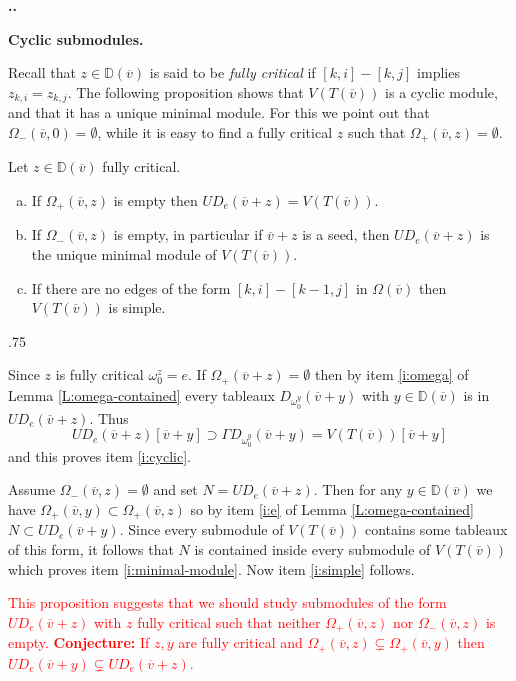 \documentclass[11pt,fleqn]{amsart}
\makeatletter
\renewcommand\thesection{\arabic{section}}
\renewcommand\proofname{Proof}
\renewenvironment{proof}[1][\textit{\proofname}]{\par
 \pushQED{\qed}%
 \normalfont \topsep.75\paraskip\relax
 \trivlist
 \item[\hskip\labelsep
 \itshape
 #1\@addpunct{.}]\ignorespaces
}{%
 \popQED\endtrivlist\@endpefalse
}
\newcounter{para}[section]
\renewcommand\thepara{\thesection.\arabic{para}}
\def\paragraph{%
 \noindent
 \refstepcounter{para}%
 \textbf{\thepara.}\hspace{1ex}%
}
\newcommand\about[1]{%
 {\bfseries#1.}%
}
\newcommand\vv{\overline{v}}
\newcommand\DD{\mathbb D}
\makeatother
\begin{document}
\paragraph
\about{Cyclic submodules}
Recall that $z \in \DD(\vv)$ is said to be \emph{fully critical} if $[k,i] - 
[k,j]$ implies $z_{k,i} = z_{k,j}$. The following proposition shows that 
$V(T(\vv))$ is a cyclic module, and that it has a unique minimal module. For 
this we point out that $\Omega_-(\vv,0) = \emptyset$, while it is easy to find
a fully critical $z$ such that $\Omega_+(\vv,z) = \emptyset$.
\begin{Proposition}
Let $z \in \DD(\vv)$ fully critical.
\begin{enumerate}[(a)]
\item 
\label{i:cyclic}
If $\Omega_+(\vv, z)$ is empty then $U D_e(\vv + z) = V(T(\vv))$.

\item
\label{i:minimal-module}
If $\Omega_-(\vv,z)$ is empty, in particular if $\vv + z$ is a seed, then 
$U D_e(\vv + z)$ is the unique minimal module of $V(T(\vv))$.

\item
\label{i:simple}
If there are no edges of the form $[k,i] - [k-1,j]$ in $\Omega(\vv)$ then
$V(T(\vv))$ is simple.
\end{enumerate}
\end{Proposition}
\begin{proof}
Since $z$ is fully critical $\omega_0^z = e$. If $\Omega_+(\vv + z) = 
\emptyset$ then by item \ref{i:omega} of Lemma \ref{L:omega-contained} every
tableaux $D_{\omega_0^y}(\vv + y)$ with $y \in \DD(\vv)$ is in $U D_e(\vv+z)$.
Thus 
\[
U D_e(\vv+z)[\vv + y] 
	\supset \Gamma D_{\omega_0^y}(\vv+y) 
	= V(T(\vv))[\vv+y]
\]
and this proves item \ref{i:cyclic}.

Assume $\Omega_-(\vv,z) = \emptyset$ and set $N = U D_e(\vv + z)$. Then 
for any $y \in \DD(\vv)$ we have $\Omega_+(\vv,y) \subset \Omega_+(\vv,z)$ so
by item \ref{i:e} of Lemma \ref{L:omega-contained} $N \subset U D_e(\vv + y)$.
Since every submodule of $V(T(\vv))$ contains some tableaux of this form, it
follows that $N$ is contained inside every submodule of $V(T(\vv))$ which 
proves item \ref{i:minimal-module}. Now item \ref{i:simple} follows.
\end{proof}

\textcolor{red}{This proposition suggests that we should study submodules of 
the form $U D_e(\vv+z)$ with $z$ fully critical such that neither 
$\Omega_+(\vv,z)$ nor $\Omega_-(\vv,z)$ is empty. \textbf{Conjecture:} If $z,y$
are fully critical and $\Omega_+(\vv,z) \subsetneq \Omega_+(\vv,y)$ then 
$UD_e(\vv + y) \subsetneq UD_e(\vv + z)$.}

\begin{bibdiv}
\begin{biblist}
\end{biblist}
\end{bibdiv}
\end{document}
